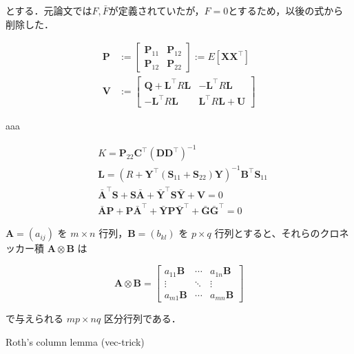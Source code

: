 とする．元論文では$F, \bar{F}$が定義されていたが，$F=0$とするため，以後の式から削除した．


\begin{align}
\mathbf{P} &:=\left[\begin{array}{cc}
\mathbf{P}_{11} & \mathbf{P}_{12} \\
\mathbf{P}_{12} & \mathbf{P}_{22}
\end{array}\right] := E\left[\mathbf{X} \mathbf{X}^\top\right] \\
\mathbf{V} &:=\left[\begin{array}{cc}
\mathbf{Q}+\mathbf{L}^\top R \mathbf{L} & -\mathbf{L}^\top R \mathbf{L} \\
-\mathbf{L}^\top R \mathbf{L} & \mathbf{L}^\top R \mathbf{L}+\mathbf{U}
\end{array}\right]
\end{align}


aaa

\begin{align}
&K=\mathbf{P}_{22} \mathbf{C}^\top\left(\mathbf{D} \mathbf{D}^\top\right)^{-1} \\
&\mathbf{L}=\left(R+\mathbf{Y}^\top\left(\mathbf{S}_{11}+\mathbf{S}_{22}\right) \mathbf{Y}\right)^{-1} \mathbf{B}^\top \mathbf{S}_{11} \\
&\bar{\mathbf{A}}^\top \mathbf{S}+\mathbf{S} \bar{\mathbf{A}}+\bar{\mathbf{Y}}^\top \mathbf{S} \bar{\mathbf{Y}}+\mathbf{V}=0 \\
&\bar{\mathbf{A}} \mathbf{P}+\mathbf{P} \bar{\mathbf{A}}^\top+\bar{\mathbf{Y}} \mathbf{P} \bar{\mathbf{Y}}^\top+\bar{\mathbf{G}} \bar{\mathbf{G}}^\top=0
\end{align}



$\mathbf{A} = (a_{ij})$ を $m \times n$ 行列，$\mathbf{B} = (b_{kl})$ を $p \times q$ 行列とすると、それらのクロネッカー積 $\mathbf{A} \otimes \mathbf{B}$ は


\begin{equation}
\mathbf{A}\otimes \mathbf{B}={\begin{bmatrix}a_{11}\mathbf{B}&\cdots &a_{1n}\mathbf{B}\\\vdots &\ddots &\vdots \\a_{m1}\mathbf{B}&\cdots &a_{mn}\mathbf{B}\end{bmatrix}}
\end{equation}


で与えられる $mp \times nq$ 区分行列である．

Roth's column lemma (vec-trick) 


